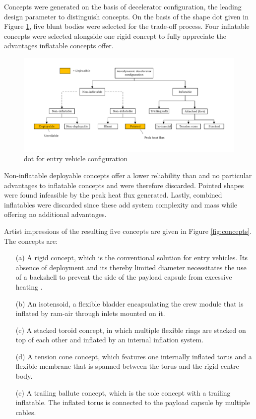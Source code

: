 Concepts were generated on the basis of decelerator configuration, the leading design parameter to distinguish concepts. On the basis of the shape \gls{dot} given in Figure \ref{fig:dotshape}, five blunt bodies were selected for the trade-off process. Four inflatable concepts were selected alongside one rigid concept to fully appreciate the advantages inflatable concepts offer.

\begin{figure}[h]
\centering
\includegraphics[width = \textwidth]{Figure/Concepts/DOT_configuration.pdf}
\vspace{-5mm}
\caption{\acrlong{dot} for entry vehicle configuration}
\label{fig:dotshape}
\end{figure}

Non-inflatable deployable concepts offer a lower reliability than and no particular advantages to inflatable concepts and were therefore discarded. Pointed shapes were found infeasible by the peak heat flux generated. Lastly, combined inflatables were discarded since these add system complexity and mass while offering no additional advantages. 

Artist impressions of the resulting five concepts are given in Figure \ref{fig:concepts}. The concepts are:
\begin{itemize}
\item[(a)] A rigid concept, which is the conventional solution for entry vehicles. Its absence of deployment and its thereby limited diameter necessitates the use of a backshell to prevent the side of the payload capsule from excessive heating \cite{Hughes2005}.
\item[(b)] An isotensoid, a flexible bladder encapsulating the crew module that is inflated by ram-air through inlets mounted on it.
\item[(c)] A stacked toroid concept, in which multiple flexible rings are stacked on top of each other and inflated by an internal inflation system.
\item[(d)] A tension cone concept, which features one internally inflated torus and a flexible membrane that is spanned between the torus and the rigid centre body.
\item[(e)] A trailing ballute concept, which is the sole concept with a trailing inflatable. The inflated torus is connected to the payload capsule by multiple cables.
\end{itemize}

